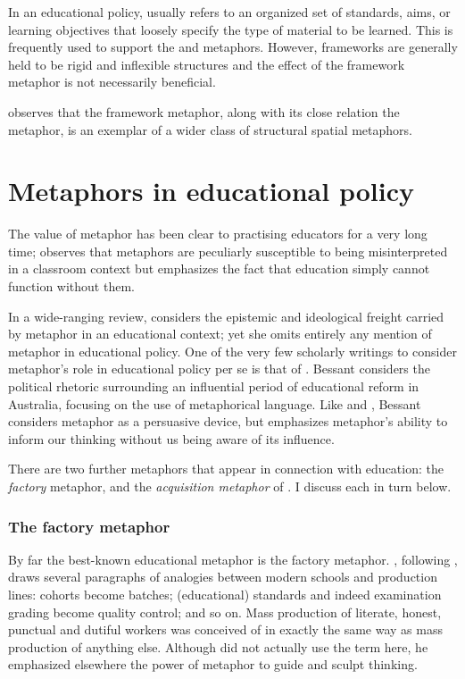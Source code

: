 In an educational policy,  usually refers to an
organized set of standards, aims, or learning objectives that loosely
specify the type of material to be learned.  This is frequently used
to support the  and  metaphors.
However, frameworks are generally held to be rigid and inflexible
structures and the effect of the framework metaphor is not necessarily
beneficial.

 observes that the framework metaphor, along with
its close relation the  metaphor, is an exemplar
of a wider class of structural spatial metaphors.

\section{Metaphors in educational policy}
The value of metaphor has been clear to practising educators for a
very long time;  observes that metaphors are
peculiarly susceptible to being misinterpreted in a classroom context
but emphasizes the fact that education simply cannot function without
them.

In a wide-ranging review,  considers the epistemic and
ideological freight carried by metaphor in an educational context; yet
she omits entirely any mention of metaphor in educational policy.  One
of the very few scholarly writings to consider metaphor's role in
educational policy per se is that of .  Bessant
considers the political rhetoric surrounding an influential period of
educational reform in Australia, focusing on the use of metaphorical
language.  Like  and ,
Bessant considers metaphor as a persuasive device, but emphasizes
metaphor's ability to inform our thinking without us being aware of
its influence.

There are two further metaphors that appear in connection with
education: the {\em factory} metaphor, and the {\em acquisition
  metaphor} of .  I discuss each in turn below.

\subsubsection*{The factory metaphor}

By far the best-known educational metaphor is the factory metaphor.
, following , draws several
paragraphs of analogies between modern schools and production lines:
cohorts become batches; (educational) standards and indeed examination
grading become quality control; and so on.  Mass production of
literate, honest, punctual and dutiful workers was conceived of in
exactly the same way as mass production of anything else.  Although
\citeauthor{claxton2013} did not actually use the term
 here, he emphasized elsewhere the power
of metaphor to guide and sculpt thinking.

